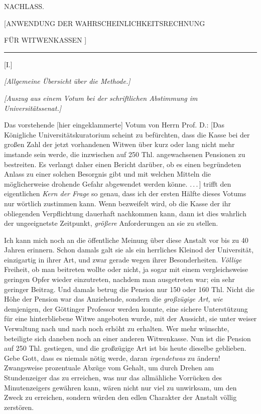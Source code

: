 \clearpage
{}
\begin{center}
{\Large NACHLASS.\par}\bigskip
{\large [ANWENDUNG DER WAHRSCHEINLICHKEITSRECHNUNG\par}
\medskip
{\large FÜR WITWENKASSEN ]\par}
\medskip\rule{.15\linewidth}{.3pt}\par\bigskip
{\large [I.]\par}
\textit{[Allgemeine Übersicht über die Methode.]}\par
\textit{[Auszug aus einem Votum bei der schriftlichen Abstimmung im Universitätssenat.]}\par
\end{center}
Das vorstehende [hier eingeklammerte] Votum von Herrn Prof. D.: [Das Königliche Universitätskuratorium scheint zu befürchten, dass die Kasse bei der großen Zahl der jetzt vorhandenen Witwen über kurz oder lang nicht mehr imstande sein werde, die inzwischen auf 250 Thl. angewachsenen Pensionen zu bestreiten. Es verlangt daher einen Bericht darüber, ob es einen begründeten Anlass zu einer solchen Besorgnis gibt und mit welchen Mitteln die möglicherweise drohende Gefahr abgewendet werden könne. .\,.\,.\,] trifft den eigentlichen \textit{Kern der Frage} so genau, dass ich der ersten Hälfte dieses Votums nur wörtlich zustimmen kann. Wenn bezweifelt wird, ob die Kasse der ihr obliegenden Verpflichtung dauerhaft nachkommen kann, dann ist dies wahrlich der ungeeignetste Zeitpunkt, \textit{größere} Anforderungen an sie zu stellen.

\indent Ich kann mich noch an die öffentliche Meinung über diese Anstalt vor bis zu 40 Jahren erinnern. Schon damals galt sie als ein herrliches Kleinod der Universität, einzigartig in ihrer Art, und zwar gerade wegen ihrer Besonderheiten. \textit{Völlige} Freiheit, ob man beitreten wollte oder nicht, ja sogar mit einem vergleichsweise geringen Opfer wieder einzutreten, nachdem man ausgetreten war; ein sehr geringer Beitrag. Und damals betrug die Pension nur 150 oder 160 Thl. Nicht die Höhe der Pension war das Anziehende, sondern die \textit{großzügige Art, wie} demjenigen, der Göttinger Professor werden konnte, eine sichere Unterstützung für eine hinterbliebene Witwe angeboten wurde, mit der Aussicht, sie unter weiser Verwaltung nach und nach noch erhöht zu erhalten. Wer mehr wünschte, beteiligte sich daneben noch an einer anderen Witwenkasse. Nun ist die Pension auf 250 Thl. gestiegen, und die großzügige Art ist bis heute dieselbe geblieben. Gebe Gott, dass es niemals nötig werde, daran \textit{irgendetwas} zu ändern! Zwangsweise prozentuale Abzüge vom Gehalt, um durch Drehen am Stundenzeiger das zu erreichen, was nur das allmähliche Vorrücken des Minutenzeigers gewähren kann, wären nicht nur viel zu unwirksam, um den Zweck zu erreichen, sondern würden den edlen Charakter der Anstalt völlig zerstören.

